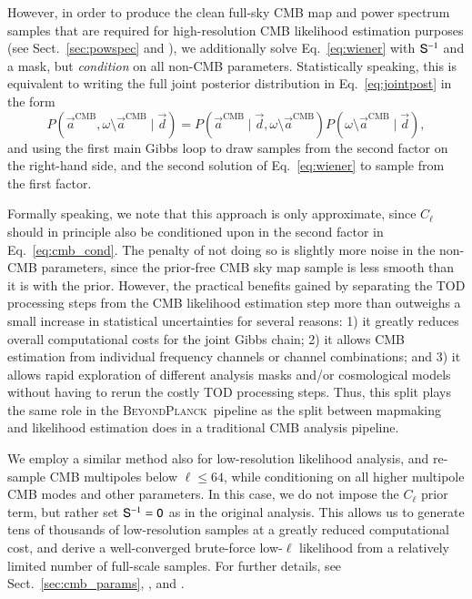 \documentclass[onecolumn]{aa}
\renewcommand{\d}[0]{\vec{d}}
\renewcommand{\a}[0]{\vec{a}}
\renewcommand{\S}[0]{\tens{S}}
\newcommand{\BP}{\textsc{BeyondPlanck}}
\begin{document}
However, in order to produce the clean full-sky CMB map and power
spectrum samples that are required for high-resolution CMB likelihood
estimation purposes (see Sect.~\ref{sec:powspec} and \citealp{bp11}),
we additionally solve Eq.~\eqref{eq:wiener} with $\S^{-1}$ and a mask,
but \emph{condition} on all non-CMB parameters. Statistically
speaking, this is equivalent to writing the full joint posterior
distribution in Eq.~\eqref{eq:jointpost} in the form
\begin{equation}
  P(\a^\mathrm{CMB}, \omega\setminus\a^{\mathrm{CMB}}\mid \d) =
  P(\a^\mathrm{CMB}\mid \d, \omega\setminus\a^{\mathrm{CMB}})
  P(\omega\setminus\a^{\mathrm{CMB}}\mid \d),
  \label{eq:cmb_cond}
\end{equation}
and using the first main Gibbs loop to draw samples from the second
factor on the right-hand side, and the second solution of
Eq.~\eqref{eq:wiener} to sample from the first factor.

Formally speaking, we note that this approach is only approximate,
since $C_{\ell}$ should in principle also be conditioned upon in the
second factor in Eq.~\eqref{eq:cmb_cond}. The penalty of not doing so
is slightly more noise in the non-CMB parameters, since the prior-free
CMB sky map sample is less smooth than it is with the prior. However,
the practical benefits gained by separating the TOD processing steps
from the CMB likelihood estimation step more than outweighs a small
increase in statistical uncertainties for several reasons: 1) it
greatly reduces overall computational costs for the joint Gibbs chain;
2) it allows CMB estimation from individual frequency channels or
channel combinations; and 3) it allows rapid exploration of different
analysis masks and/or cosmological models without having to rerun the
costly TOD processing steps. Thus, this split plays the same role in
the \BP\ pipeline as the split between mapmaking and likelihood
estimation does in a traditional CMB analysis pipeline.

We employ a similar method also for low-resolution likelihood analysis,
and re-sample CMB multipoles below $\ell\le64$, while conditioning on
all higher multipole CMB modes and other parameters. In this case, we
do not impose the $C_{\ell}$ prior term, but rather set $\S^{-1}=\tens 0$ as
in the original analysis. This allows us to generate tens of thousands
of low-resolution samples at a greatly reduced computational cost, and
derive a well-converged brute-force low-$\ell$ likelihood from a
relatively limited number of full-scale samples. For further details,
see Sect.~\ref{sec:cmb_params}, \citet{bp11}, and \citet{bp12}.
\end{document}
